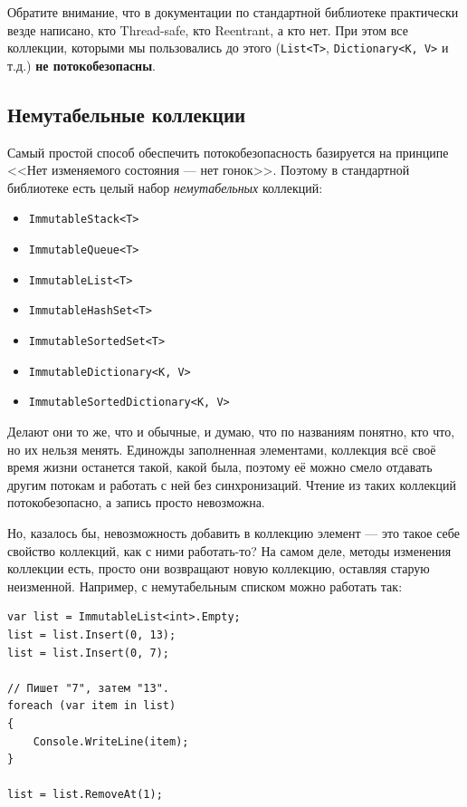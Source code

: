 \documentclass[a5paper]{article}
\begin{document}
Обратите внимание, что в документации по стандартной библиотеке практически везде написано, кто Thread-safe, кто Reentrant, а кто нет. При этом все коллекции, которыми мы пользовались до этого (\texttt{List<T>}, \texttt{Dictionary<K, V>} и т.д.) \textbf{не потокобезопасны}.

\subsection{Немутабельные коллекции}

Самый простой способ обеспечить потокобезопасность базируется на принципе <<Нет изменяемого состояния --- нет гонок>>. Поэтому в стандартной библиотеке есть целый набор \textit{немутабельных} коллекций:

\begin{itemize}
    \item \texttt{ImmutableStack<T>}
    \item \texttt{ImmutableQueue<T>}
    \item \texttt{ImmutableList<T>}
    \item \texttt{ImmutableHashSet<T>}
    \item \texttt{ImmutableSortedSet<T>}
    \item \texttt{ImmutableDictionary<K, V>}
    \item \texttt{ImmutableSortedDictionary<K, V>}
\end{itemize}

Делают они то же, что и обычные, и думаю, что по названиям понятно, кто что, но их нельзя менять. Единожды заполненная элементами, коллекция всё своё время жизни останется такой, какой была, поэтому её можно смело отдавать другим потокам и работать с ней без синхронизаций. Чтение из таких коллекций потокобезопасно, а запись просто невозможна. 

Но, казалось бы, невозможность добавить в коллекцию элемент --- это такое себе свойство коллекций, как с ними работать-то? На самом деле, методы изменения коллекции есть, просто они возвращают новую коллекцию, оставляя старую неизменной. Например, с немутабельным списком можно работать так:

\begin{verbatim}
var list = ImmutableList<int>.Empty;
list = list.Insert(0, 13);
list = list.Insert(0, 7);

// Пишет "7", затем "13".
foreach (var item in list)
{
    Console.WriteLine(item);
}

list = list.RemoveAt(1);
\end{verbatim}
\end{document}
